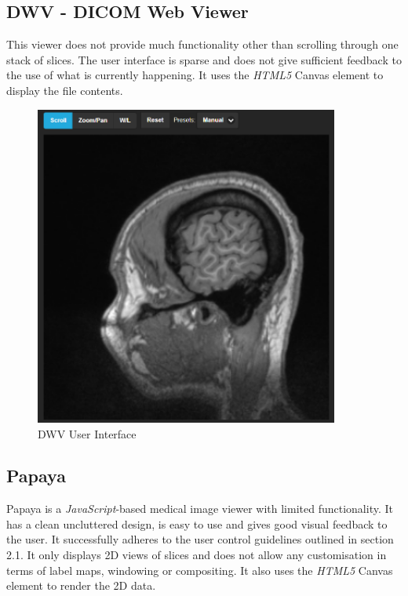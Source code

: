 \documentclass[a4paper,11pt,titlepage]{article}
\begin{document}
\subsection{DWV - DICOM Web Viewer}
This viewer does not provide much functionality other than scrolling through one stack of slices. The user interface is sparse and does not give sufficient feedback to the use of what is currently happening. It uses the \textit{HTML5} Canvas element to display the file contents.

\begin{figure}[ht!]
\centering
\includegraphics[width=100mm]{graphics/webViewer_01.png}
\caption{DWV User Interface}
\label{fig:UIdesign1}
\end{figure}

\subsection{Papaya}
Papaya\cite{papaya} is a \textit{JavaScript}-based medical image viewer with limited functionality. It has a clean uncluttered design, is easy to use and gives good visual feedback to the user. It successfully adheres to the user control guidelines outlined in section 2.1. It only displays 2D views of slices and does not allow any customisation in terms of label maps, windowing or compositing. It also uses the \textit{HTML5} Canvas element to render the 2D data.
\end{document}
